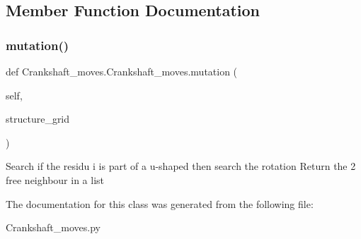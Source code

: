 \subsection{Member Function Documentation}
\mbox{\label{classCrankshaft__moves_1_1Crankshaft__moves_a9373405d3071eedd7d35a92ecd1aa3af}} 
\subsubsection{\texorpdfstring{mutation()}{mutation()}}
{\footnotesize\ttfamily def Crankshaft\+\_\+moves.\+Crankshaft\+\_\+moves.\+mutation (\begin{DoxyParamCaption}\item[{}]{self,  }\item[{}]{structure\+\_\+grid }\end{DoxyParamCaption})}

\begin{DoxyVerb}Search if the residu i is part of a u-shaped then search the rotation
    Return the 2 free neighbour in a list
\end{DoxyVerb}
 

The documentation for this class was generated from the following file\+:\begin{DoxyCompactItemize}
\item 
Crankshaft\+\_\+moves.\+py\end{DoxyCompactItemize}
